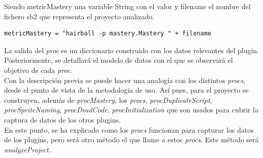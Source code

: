 \documentclass[a4paper, 12pt]{book}
\begin{document}
Siendo metricMastery una variable String con el valor y filename el nombre del fichero
sb2 que representa el proyecto analizado. \\

\begingroup
\fontsize{8pt}{9pt}\selectfont
\begin{verbatim}
metricMastery = "hairball -p mastery.Mastery " + filename
\end{verbatim}
\endgroup

La salida del \emph{proc} es un diccionario construido con los datos relevantes del 
plugin. Posteriormente, se detallará el modelo de datos con el que se observará el
objetivo de cada \emph{proc}. \\

Con la descripción previa se puede hacer una analogía con los distintos \emph{procs}, desde
el punto de vista de la metodologia de uso. Así pues, para el proyecto se construyen, 
además de \emph{procMastery}, los \emph{procs}, \emph{procDuplicateScript}, 
\emph{procSpriteNaming}, \emph{procDeadCode}, \emph{procInitialization} que son usados
para cubrir la captura de datos de los otros plugins. \\

En este punto, se ha explicado como los \emph{procs} funcionan para capturar los datos
de los plugins, pero será otro método el que llame a estos \emph{procs}. Este método 
será \emph{analyzeProject}.
\end{document}
